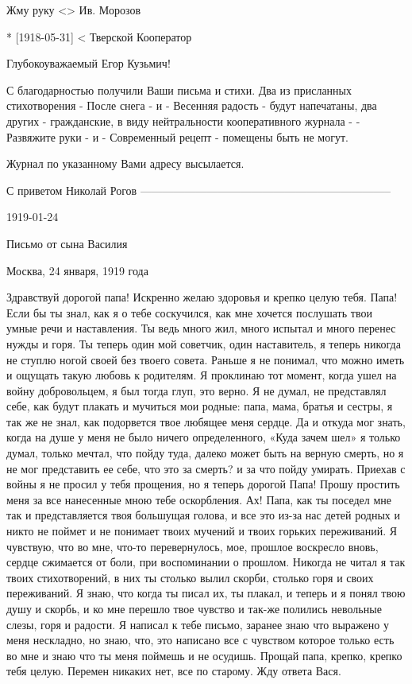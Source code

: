 \documentclass[]{memoir}
\begin{document}
Жму руку <> Ив. Морозов


* [1918-05-31] < Тверской Кооператор

Глубокоуважаемый Егор Кузьмич!

С благодарностью получили Ваши письма и стихи. Два из присланных стихотворения - После снега - и - Весенняя радость - будут напечатаны, два других - гражданские, в виду нейтральности кооперативного журнала - - Развяжите руки - и - Современный рецепт - помещены быть не могут.

Журнал по указанному Вами адресу высылается.

С приветом
Николай Рогов
--------------------------------------------------------------------

1919-01-24

Письмо от сына Василия 

Москва, 24 января, 1919 года

Здравствуй дорогой папа!
Искренно желаю здоровья и крепко целую тебя.
Папа! Если бы ты знал, как я о тебе соскучился, как мне хочется послушать твои умные речи и наставления. 
Ты ведь много жил, много испытал и много перенес нужды и горя. 
Ты теперь один мой советчик, один наставитель, я теперь никогда не ступлю ногой своей без твоего совета.
Раньше я не понимал, что можно иметь и ощущать такую любовь к родителям.
Я проклинаю тот момент, когда ушел на войну добровольцем, я был тогда глуп, это верно.
Я не думал, не представлял себе, как будут плакать и мучиться мои родные:  папа, мама, братья и сестры, я так же не знал, как подорвется твое любящее меня сердце.
Да и откуда мог знать, когда на душе у меня не было ничего определенного, «Куда зачем шел» я только думал, только мечтал, что пойду туда, далеко может быть на верную смерть, но я не мог представить ее себе, что это за смерть? и за что пойду умирать. Приехав с войны я не просил у тебя прощения, но я теперь дорогой Папа! Прошу простить меня за все нанесенные мною тебе оскорбления. 
Ах! Папа, как ты поседел мне так и представляется твоя большущая голова, и все это из-за нас детей родных и никто не поймет и не понимает твоих мучений и твоих горьких переживаний.
Я чувствую, что во мне, что-то перевернулось, мое, прошлое воскресло вновь, сердце сжимается от боли, при воспоминании о прошлом. Никогда не читал я так твоих стихотворений, в них ты столько вылил скорби, столько горя и своих переживаний.
Я знаю, что когда ты писал их, ты плакал, и теперь и я понял твою душу и скорбь, и ко мне перешло твое чувство и так-же полились невольные слезы, горя и радости. 
Я написал к тебе письмо, заранее знаю что выражено у меня нескладно, но знаю, что, это написано все с чувством которое только есть во мне  и знаю что ты меня поймешь и не осудишь. Прощай папа, крепко, крепко тебя целую.
Перемен никаких нет, все по старому.
Жду ответа Вася.
\end{document}
